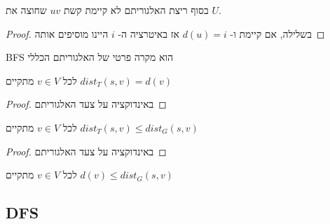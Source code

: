 \begin{claim}
בסוף ריצת האלגוריתם לא קיימת קשת 
$uv$
שחוצה את $U$.
\end{claim}
\begin{proof}
בשלילה, אם קיימת ו-%
$d(u) = i$
אז באיטרציה ה-%
$i$
היינו מוסיפים אותה
\end{proof}

\begin{corollary}
BFS
הוא מקרה פרטי של האלגוריתם הכללי
\end{corollary}

\begin{claim}
לכל
$v \in V$
מתקיים
$dist_T(s, v) = d(v)$
\end{claim}
\begin{proof}
באינדוקציה על צעד האלגוריתם
\end{proof}

\begin{claim}
לכל
$v \in V$
מתקיים
$dist_T(s, v) \leq dist_G(s,v)$
\end{claim}
\begin{proof}
באינדוקציה על צעד האלגוריתם
\end{proof}

\begin{theorem}
לכל
$v \in V$
מתקיים
$d(v) \leq dist_G(s,v)$
\end{theorem}



\subsection*{DFS}

\begin{center}
\end{center}

